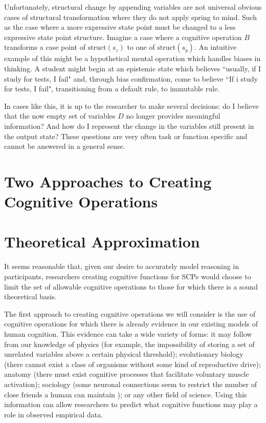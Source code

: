 Unfortunately, structural change by appending variables are not universal obvious cases of structural transformation where they do not apply spring to mind. Such as the case where a more expressive state point must be changed to a less expressive state point structure. Imagine a case where a cognitive operation $B$ transforms a case point of $\textrm{struct}(s_z)$ to one of $\textrm{struct}(s_y)$. An intuitive example of this might be a hypothetical mental operation which handles biases in thinking. A student might begin at an epistemic state which believes ``usually, if I study for tests, I fail" and, through bias confirmation, come to believe ``If i study for tests, I fail", transitioning from a default rule, to immutable rule. 

In cases like this, it is up to the researcher to make several decisions: do I believe that the now empty set of variables $D$ no longer provides meaningful information? And how do I represent the change in the variables still present in the output state? These questions are very often task or function specific and cannot be answered in a general sense.

\section{Two Approaches to Creating Cognitive Operations}
\section{Theoretical Approximation}
It seems reasonable that, given our desire to accurately model reasoning in participants, researchers creating cognitive functions for SCPs would choose to limit the set of allowable cognitive operations to those for which there is a sound theoretical basis.

The first approach to creating cognitive operations we will consider is the use of cognitive operations for which there is already evidence in our existing models of human cognition. This evidence can take a wide variety of forms: it may follow from our knowledge of physics (for example, the impossibility of storing a set of unrelated variables above a certain physical threshold); evolutionary biology (there cannot exist a class of organisms without some kind of reproductive drive); anatomy (there must exist cognitive processes that facilitate voluntary muscle activation); sociology (some neuronal connections seem to restrict the number of close friends a human can maintain \citep{gonccalves2011modeling}); or any other field of science. Using this information can allow researchers to predict what cognitive functions may play a role in observed empirical data. 

